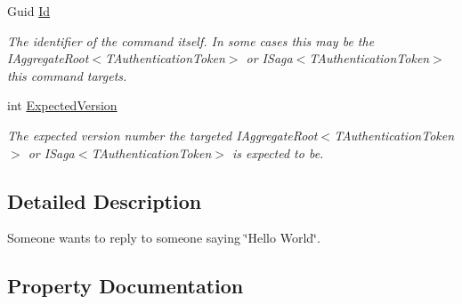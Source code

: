 \begin{DoxyCompactItemize}
Guid \hyperlink{classCqrs_1_1Akka_1_1Tests_1_1Unit_1_1Commands_1_1ReplyToHelloWorldCommand_a28c1edb8c3b32d8d003314271dd82924_a28c1edb8c3b32d8d003314271dd82924}{Id}
\begin{DoxyCompactList}\small\item\em The identifier of the command itself. In some cases this may be the I\+Aggregate\+Root$<$\+T\+Authentication\+Token$>$ or I\+Saga$<$\+T\+Authentication\+Token$>$ this command targets. \end{DoxyCompactList}\item 
int \hyperlink{classCqrs_1_1Akka_1_1Tests_1_1Unit_1_1Commands_1_1ReplyToHelloWorldCommand_a3901b00973351dff228554de639ed788_a3901b00973351dff228554de639ed788}{Expected\+Version}
\begin{DoxyCompactList}\small\item\em The expected version number the targeted I\+Aggregate\+Root$<$\+T\+Authentication\+Token$>$ or I\+Saga$<$\+T\+Authentication\+Token$>$ is expected to be. \end{DoxyCompactList}\end{DoxyCompactItemize}


\subsection{Detailed Description}
Someone wants to reply to someone saying \char`\"{}\+Hello World\char`\"{}. 



\subsection{Property Documentation}
\mbox{\label{classCqrs_1_1Akka_1_1Tests_1_1Unit_1_1Commands_1_1ReplyToHelloWorldCommand_a556c313a49a66d1fd4f3df8dc15344ec_a556c313a49a66d1fd4f3df8dc15344ec}} 
